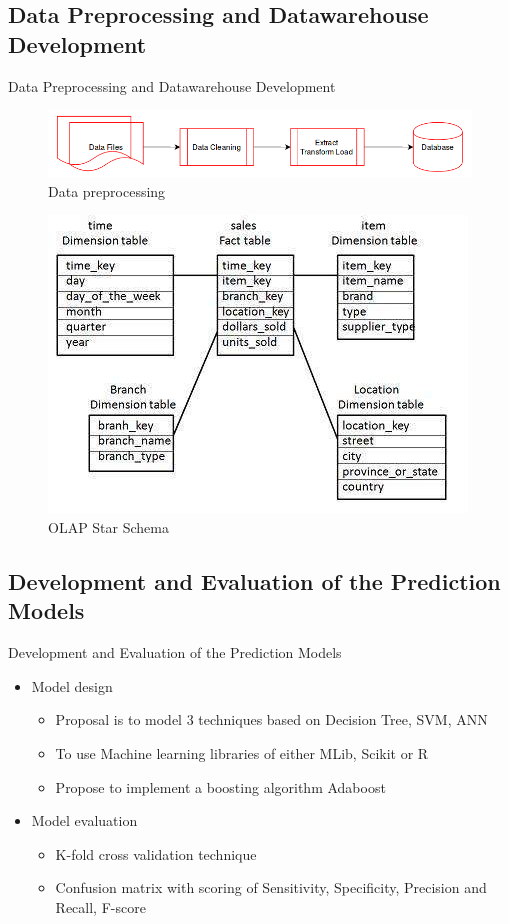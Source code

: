 \documentclass{beamer}
\begin{document}
\subsection{Data Preprocessing and Datawarehouse Development }
\begin{frame}{Data Preprocessing and Datawarehouse Development}
	\begin{figure}[h]
		\includegraphics[scale = 0.35]{figures/dataloadprocess.png}
		\centering
		\caption{Data preprocessing}
	\end{figure}
	 \begin{figure}
	 	\includegraphics[scale = 0.35]{figures/olap_start_schema.jpg}
	 	\centering
	 	\caption{OLAP Star Schema}
	 \end{figure}
\end{frame}

\subsection{Development and Evaluation of the Prediction Models}
\begin{frame}{Development and Evaluation of the Prediction Models}
	\begin{itemize}
		\item Model design
		\begin{itemize}
			\item Proposal is to model 3 techniques based on Decision Tree, SVM, ANN
			\item To use Machine learning libraries of either MLib, Scikit or R
			\item Propose to implement a boosting algorithm Adaboost			
		\end{itemize}
		\item Model evaluation
		\begin{itemize}
			\item K-fold cross validation technique
			\item Confusion matrix with scoring of Sensitivity, Specificity, Precision and Recall, F-score 
		\end{itemize}
	\end{itemize}
\end{frame}
\end{document}
